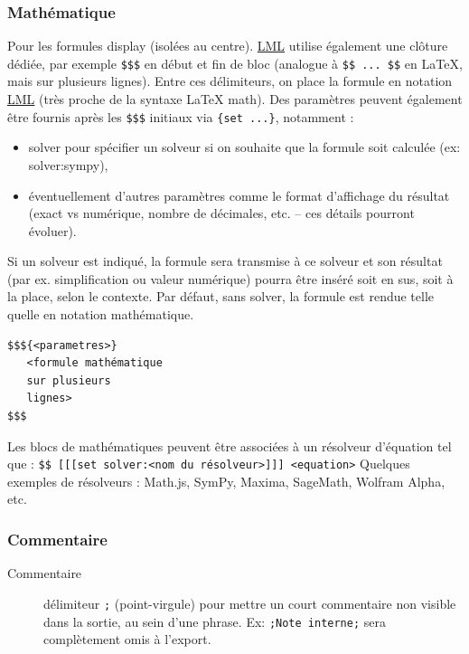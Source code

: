 \documentclass[a4paper,12pt]{article}
\begin{document}
\subsubsection{Mathématique}
\label{sec:org1fc3b94}
Pour les formules display (isolées au centre). \protect\hyperlink{gls-2}{\label{gls-2-use-12}LML} utilise également une clôture dédiée, par exemple \texttt{\$\$\$} en début et fin de bloc (analogue à \texttt{\$\$ ... \$\$} en \LaTeX{}, mais sur plusieurs lignes). Entre ces délimiteurs, on place la formule en notation \protect\hyperlink{gls-2}{\label{gls-2-use-13}LML} (très proche de la syntaxe \LaTeX{} math). Des paramètres peuvent également être fournis après les \texttt{\$\$\$} initiaux via \texttt{\{set ...\}}, notamment :
\begin{itemize}
\item solver pour spécifier un solveur si on souhaite que la formule soit calculée (ex: solver:sympy),
\item éventuellement d’autres paramètres comme le format d’affichage du résultat (exact vs numérique, nombre de décimales, etc. – ces détails pourront évoluer).
\end{itemize}

Si un solveur est indiqué, la formule sera transmise à ce solveur et son résultat (par ex. simplification ou valeur numérique) pourra être inséré soit en sus, soit à la place, selon le contexte. Par défaut, sans solver, la formule est rendue telle quelle en notation mathématique.

\begin{verbatim}
$$${<parametres>}
   <formule mathématique
   sur plusieurs
   lignes>
$$$
\end{verbatim}

Les blocs de mathématiques peuvent être associées à un résolveur d'équation tel que :
\texttt{\$\$ [[[set solver:<nom du résolveur>]]] <equation>}
Quelques exemples de résolveurs : Math.js, SymPy, Maxima, SageMath, Wolfram Alpha, etc.
\subsubsection{Commentaire}
\label{sec:org5b1929b}
\begin{description}
\item[{Commentaire}] délimiteur \texttt{;} (point-virgule) pour mettre un court commentaire non visible dans la sortie, au sein d’une phrase. Ex: \texttt{;Note interne;} sera complètement omis à l’export.
\end{description}
\end{document}
